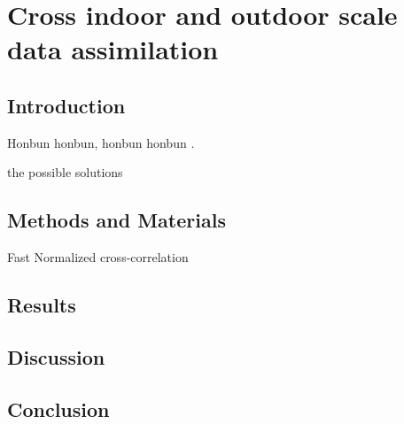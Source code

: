 \chapter{Cross indoor and outdoor scale data assimilation}

\section{Introduction}

Honbun honbun, honbun honbun \citep{zhao_crop_2019}. 



the possible solutions 






\section{Methods and Materials}



Fast Normalized cross-correlation \citet{yoo_fast_2009}


\section{Results}




\section{Discussion}

\section{Conclusion}